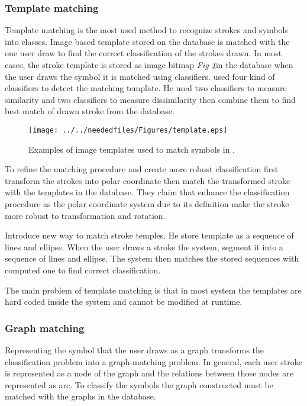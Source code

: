 \subsubsection{Template matching}
\label{sec:Template matching}


Template matching is the most used method to recognize strokes and symbols into classes.  Image based template stored on the database is matched with the one user draw to find the correct classification of the strokes drawn.  In most cases, the stroke template is stored as image bitmap \textit{Fig \ref{fig:template}}in the database when the user draws the symbol it is matched using classifiers. \cite {imagetrainable48,HierarchicalParsing7}  used four kind of classifiers to detect the matching template. He used two classifiers to measure similarity and two classifiers to measure dissimilarity then combine them to find best match of drawn stroke from the database.

\begin{figure}
	\centering
		\texttt{[image: ../../neededfiles/Figures/template.eps]}
	\caption[Template matching]{Examples of image templates used to match symbols in \cite{imagetrainable48}. }
	\label{fig:template}
\end{figure}

To refine the matching procedure and create more robust classification \cite {imagetrainable48}  first transform the strokes into polar coordinate then match the transformed stroke with the templates in the database. They claim that enhance the classification procedure as the polar coordinate system due to its definition make the stroke more robust to transformation and rotation.

\cite{templatefrag21}  Introduce new way to match stroke temples. He store template as a sequence of lines and ellipse.  When the user draws a stroke the system, segment it into a sequence of lines and ellipse. The system then matches the stored sequences with computed one to find correct classification.

The main problem of template matching is that in most system the templates are hard coded inside the system and cannot be modified at runtime.


\subsubsection{Graph matching}
\label{sec:Graph matching}

Representing the symbol that the user draws as a graph transforms the classification problem into a graph-matching problem. In general, each user stroke is represented as a node of the graph and the relations between those nodes are represented as arc. To classify the symbols the graph constructed must be matched with the graphs in the database.

